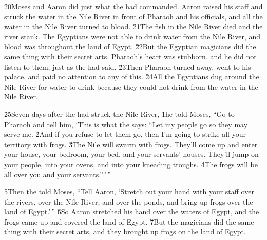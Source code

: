 \v{20}Moses and Aaron did just what the  had commanded. Aaron raised his staff and struck the water in the Nile River in front of Pharaoh and his officials, and all the water in the Nile River turned to blood. \v{21}The fish in the Nile River died and the river stank. The Egyptians were not able to drink water from the Nile River, and blood was throughout the land of Egypt. \v{22}But the Egyptian magicians did the same thing with their secret arts. Pharaoh's heart was stubborn, and he did not listen to them, just as the  had said. \v{23}Then Pharaoh turned away, went to his palace, and paid no attention to any of this. \v{24}All the Egyptians dug around the Nile River for water to drink because they could not drink from the water in the Nile River.

\v{25}Seven days after the  had struck the Nile River,
\v{1}he told Moses, ``Go to Pharaoh and tell him, `This is what the  says: ``Let my people go so they may serve me. \v{2}And if you refuse to let them go, then I'm going to strike all your territory with frogs. \v{3}The Nile will swarm with frogs. They'll come up and enter your house, your bedroom, your bed, and your servants' houses. They'll jump on your people, into your ovens, and into your kneading troughs. \v{4}The frogs will be all over you and your servants.''\,'\,''

\v{5}Then the  told Moses, ``Tell Aaron, `Stretch out your hand with your staff over the rivers, over the Nile River, and over the ponds, and bring up frogs over the land of Egypt.'\,'' \v{6}So Aaron stretched his hand over the waters of Egypt, and the frogs came up and covered the land of Egypt. \v{7}But the magicians did the same thing with their secret arts, and they brought up frogs on the land of Egypt.


